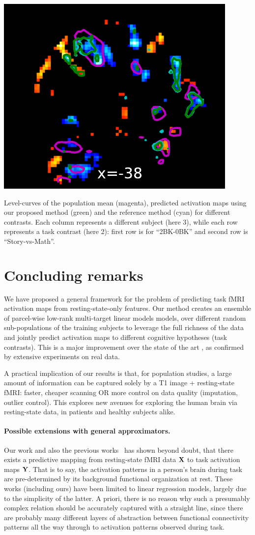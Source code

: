 \begin{pagefigure}
  \hspace{-.2cm}
  \includegraphics[width=.33\linewidth]{figures/brain_STORY-MATH_137633_01bags.pdf}
  \caption{Level-curves of the population mean (magenta), predicted activation
    maps using our proposed method (green) and the reference method \citep{tavor2016task}
    (cyan) for different contrasts. Each column represents a different subject (here 3),
    while each row represents a task contrast (here 2): first row is for ``2BK-0BK'' and second row is ``Story-vs-Math''.}
  \label{fig:zmaps}
\end{pagefigure}
  
\section{Concluding remarks}
We have proposed a general framework for the problem of predicting task fMRI activation maps
from resting-state-only features. Our method creates an ensemble of parcel-wise low-rank multi-target
linear models models, over different random sub-populations of the training subjects to leverage
the full richness of the data and jointly predict activation maps to different cognitive hypotheses
(task contrasts). This is a major improvement over the state of the art \citep{tavor2016task},
as confirmed by extensive experiments on real data. 

A practical implication of our results is that, for population
studies, a large amount of information can be captured solely by a T1
image + resting-state fMRI: faster, cheaper scanning OR more control on data quality
(imputation, outlier control). This explores new avenues for exploring
the human brain via resting-state data, in patients and healthy subjects alike.

\paragraph{Possible extensions with general approximators.} Our work and also the previous works~\citep{tavor2016task,cole2016,bzdok2016} has shown beyond doubt, that there exists a predictive mapping from resting-state fMRI data $\mathbf{X}$ to task activation maps $\mathbf{Y}$. That is to say, the activation patterns in a person's brain during task are pre-determined by its background functional organization at rest. These works (including ours) have been limited to linear regression models, largely due to the simplicity of the latter. A priori, there is no reason why such a presumably complex relation should be accurately captured with a straight line, since there are probably many different layers of abstraction between functional connectivity patterns all the way through to activation patterns observed during task.

